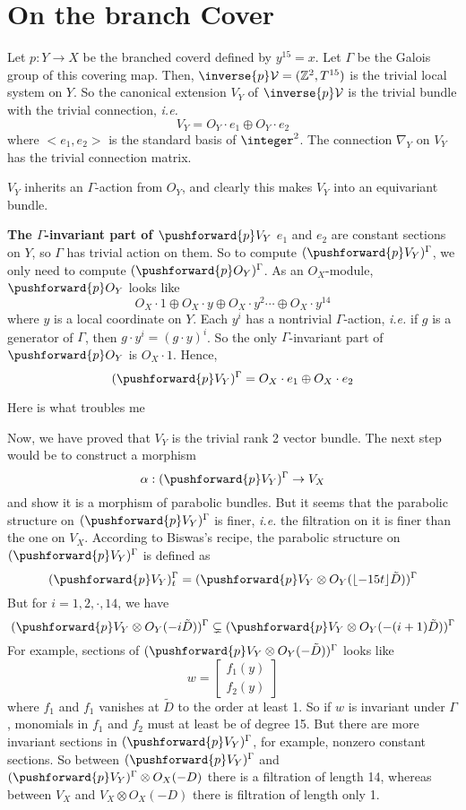 \documentclass{article}
\DeclarePairedDelimiter\floor{\lfloor}{\rfloor}
\renewcommand{\vector}[2]{
\left[\begin{array}{c}
    {#1} \\
    {#2}
    \end{array}\right]
}
\begin{document}
\section{On the branch Cover}
\newcommand{\invariant}{(\pushforward{p}V_Y)^{\Gamma}}
\newcommand{\tD}{\tilde{D}} 
Let $p : Y \rightarrow X$ be the branched coverd defined by $y^{15} = x$. 
Let $\Gamma$ be the Galois group of this covering map.
Then, $\inverse{p}\V = (\mathbb{Z}^2, T^{15})$ is the trivial local system on $Y$.
So the canonical extension $V_Y$ of $\inverse{p}\V$ is the trivial bundle with the trivial 
connection, \emph{i.e.}
\[
    V_Y = O_Y\cdot e_1 \oplus O_Y\cdot e_2
\]
where $<e_1, e_2>$ is the standard basis of $\integer^2$. The connection $\nabla_Y$ on $V_Y$
has the trivial connection matrix.

$V_Y$ inherits an $\Gamma$-action from $O_Y$, and clearly this makes $V_Y$ into an equivariant
bundle. 

\textbf{The $\Gamma$-invariant part of $\pushforward{p}V_Y$}\newline
$e_1$ and $e_2$ are constant sections on $Y$, so $\Gamma$ has trivial action on them.
So to compute $(\pushforward{p}V_Y)^{\Gamma}$, we only need to compute 
$(\pushforward{p}O_Y)^{\Gamma}$. As an $O_X$-module, $\pushforward{p}O_Y$ looks like
\[
    O_X\cdot 1 \oplus O_X\cdot y \oplus O_X\cdot y^2 \cdots \oplus O_X\cdot y^{14}
\]
where $y$ is a local coordinate on $Y$. Each $y^i$ has a nontrivial $\Gamma$-action,
\emph{i.e.} if $g$ is a generator of $\Gamma$, then $g\cdot y^i = (g\cdot y)^i$.
So the only $\Gamma$-invariant part of $\pushforward{p}O_Y$ is $O_X\cdot 1$. Hence,
\[
    (\pushforward{p}V_Y)^{\Gamma} = O_X\cdot e_1 \oplus O_X\cdot e_2
\]

\color{red} Here is what troubles me

Now, we have proved that $V_Y$ is the trivial rank 2 vector bundle. The next step would
be to construct a morphism 
\[
    \alpha : (\pushforward{p}V_Y)^{\Gamma} \rightarrow V_X
\]
and show it is a morphism of parabolic bundles. But it seems that the parabolic structure
on $(\pushforward{p}V_Y)^{\Gamma}$ is finer, \emph{i.e.} the filtration on it is finer than
the one on $V_X$. According to Biswas's recipe, the parabolic structure on $\invariant$ is
defined as
\[
    \invariant_t = (\pushforward{p} V_Y\otimes O_Y(\floor*{-15t}\tD))^{\Gamma}
\]
But for $i = 1, 2, \cdot, 14$, we have
\[
    (\pushforward{p}V_Y\otimes O_Y(-i\tD))^{\Gamma} \subsetneq
    (\pushforward{p}V_Y\otimes O_Y(-(i+1)\tD))^{\Gamma}
\]
For example, sections of $(\pushforward{p}V_Y\otimes O_Y(-\tD))^{\Gamma}$ looks like
\[
    w = \vector{f_1(y)}{f_2(y)}
\]
where $f_1$ and $f_1$ vanishes at $\tD$ to the order at least 1. So if $w$ is invariant
under $\Gamma$, monomials in $f_1$ and $f_2$ must at least be of degree 15. But there are
more invariant sections in $\invariant$, for example, nonzero constant sections. So
between $\invariant$ and $\invariant\otimes O_X(-D)$ there is a filtration of length 14, 
whereas between $V_X$ and $V_X\otimes O_X(-D)$ there is filtration of length only 1.     



    

  
\end{document}
